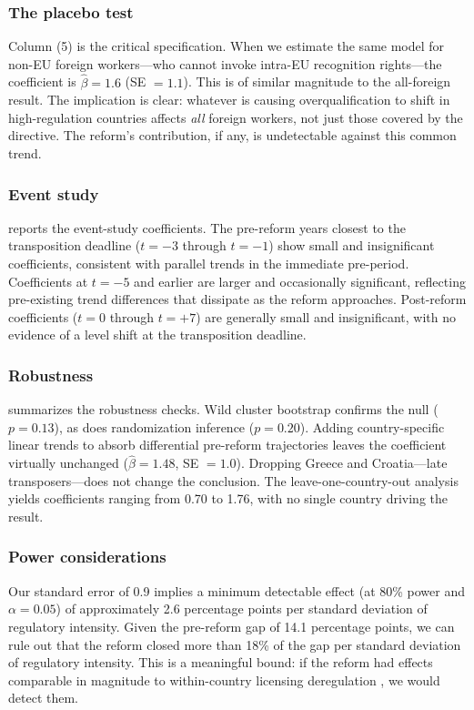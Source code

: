 \documentclass[12pt]{article}
\begin{document}
\subsubsection*{The placebo test} Column (5) is the critical specification. When we estimate the same model for non-EU foreign workers---who cannot invoke intra-EU recognition rights---the coefficient is $\hat\beta = 1.6$ (SE $= 1.1$). This is of similar magnitude to the all-foreign result. The implication is clear: whatever is causing overqualification to shift in high-regulation countries affects \emph{all} foreign workers, not just those covered by the directive. The reform's contribution, if any, is undetectable against this common trend.

\subsubsection*{Event study}  reports the event-study coefficients. The pre-reform years closest to the transposition deadline ($t = -3$ through $t = -1$) show small and insignificant coefficients, consistent with parallel trends in the immediate pre-period. Coefficients at $t = -5$ and earlier are larger and occasionally significant, reflecting pre-existing trend differences that dissipate as the reform approaches. Post-reform coefficients ($t = 0$ through $t = +7$) are generally small and insignificant, with no evidence of a level shift at the transposition deadline.



\subsubsection*{Robustness}  summarizes the robustness checks. Wild cluster bootstrap confirms the null ($p = 0.13$), as does randomization inference ($p = 0.20$). Adding country-specific linear trends to absorb differential pre-reform trajectories leaves the coefficient virtually unchanged ($\hat\beta = 1.48$, SE $= 1.0$). Dropping Greece and Croatia---late transposers---does not change the conclusion. The leave-one-country-out analysis yields coefficients ranging from 0.70 to 1.76, with no single country driving the result.



\subsubsection*{Power considerations} Our standard error of 0.9 implies a minimum detectable effect (at 80\% power and $\alpha = 0.05$) of approximately 2.6 percentage points per standard deviation of regulatory intensity. Given the pre-reform gap of 14.1 percentage points, we can rule out that the reform closed more than 18\% of the gap per standard deviation of regulatory intensity. This is a meaningful bound: if the reform had effects comparable in magnitude to within-country licensing deregulation \citep{blair2019}, we would detect them.
\end{document}
